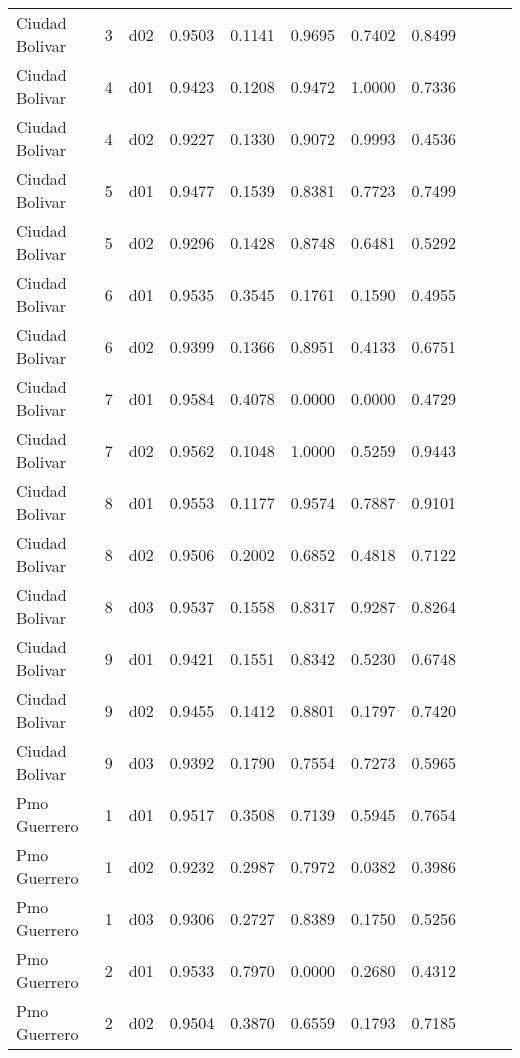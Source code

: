 \begin{landscape}
\begin{longtable}{p{5cm}rrrrrrrrrr}
       Ciudad Bolivar  & 3 &     d02 &   0.9503 &  0.1141 &    0.9695 &   0.7402 &    0.8499 \\
       Ciudad Bolivar  & 4 &     d01 &   0.9423 &  0.1208 &    0.9472 &   1.0000 &    0.7336 \\
       Ciudad Bolivar  & 4 &     d02 &   0.9227 &  0.1330 &    0.9072 &   0.9993 &    0.4536 \\
       Ciudad Bolivar  & 5 &     d01 &   0.9477 &  0.1539 &    0.8381 &   0.7723 &    0.7499 \\
       Ciudad Bolivar  & 5 &     d02 &   0.9296 &  0.1428 &    0.8748 &   0.6481 &    0.5292 \\
       Ciudad Bolivar  & 6 &     d01 &   0.9535 &  0.3545 &    0.1761 &   0.1590 &    0.4955 \\
       Ciudad Bolivar  & 6 &     d02 &   0.9399 &  0.1366 &    0.8951 &   0.4133 &    0.6751 \\
       Ciudad Bolivar  & 7 &     d01 &   0.9584 &  0.4078 &    0.0000 &   0.0000 &    0.4729 \\
       Ciudad Bolivar  & 7 &     d02 &   0.9562 &  0.1048 &    1.0000 &   0.5259 &    0.9443 \\
       Ciudad Bolivar  & 8 &     d01 &   0.9553 &  0.1177 &    0.9574 &   0.7887 &    0.9101 \\
       Ciudad Bolivar  & 8 &     d02 &   0.9506 &  0.2002 &    0.6852 &   0.4818 &    0.7122 \\
       Ciudad Bolivar  & 8 &     d03 &   0.9537 &  0.1558 &    0.8317 &   0.9287 &    0.8264 \\
       Ciudad Bolivar  & 9 &     d01 &   0.9421 &  0.1551 &    0.8342 &   0.5230 &    0.6748 \\
       Ciudad Bolivar  & 9 &     d02 &   0.9455 &  0.1412 &    0.8801 &   0.1797 &    0.7420 \\
       Ciudad Bolivar  & 9 &     d03 &   0.9392 &  0.1790 &    0.7554 &   0.7273 &    0.5965 \\
         Pmo Guerrero  & 1 &     d01 &   0.9517 &  0.3508 &    0.7139 &   0.5945 &    0.7654 \\
         Pmo Guerrero  & 1 &     d02 &   0.9232 &  0.2987 &    0.7972 &   0.0382 &    0.3986 \\
         Pmo Guerrero  & 1 &     d03 &   0.9306 &  0.2727 &    0.8389 &   0.1750 &    0.5256 \\
         Pmo Guerrero  & 2 &     d01 &   0.9533 &  0.7970 &    0.0000 &   0.2680 &    0.4312 \\
         Pmo Guerrero  & 2 &     d02 &   0.9504 &  0.3870 &    0.6559 &   0.1793 &    0.7185 \\

\end{longtable}
\end{landscape}
